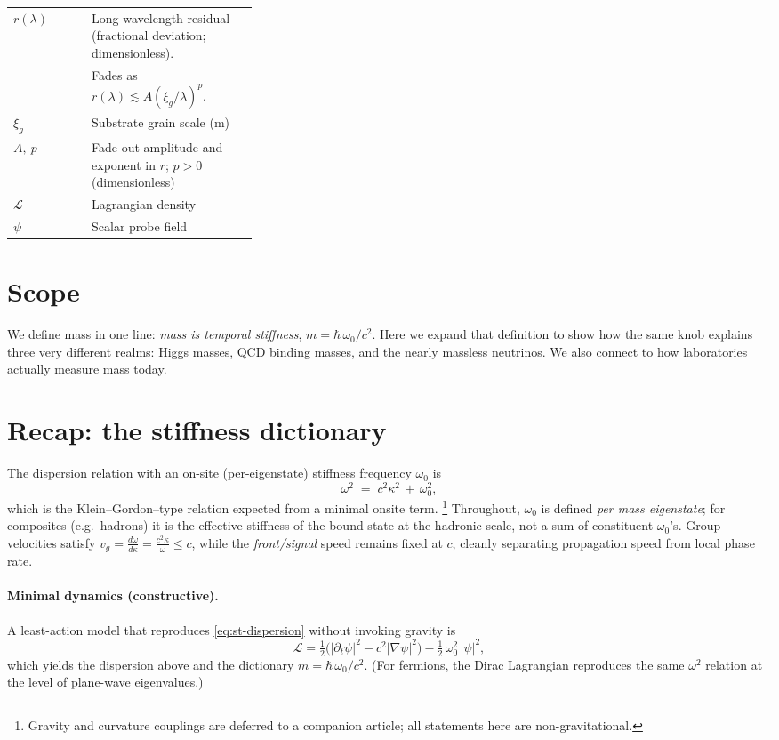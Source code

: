 \documentclass[11pt,oneside]{article}
\begin{document}
\begin{table}[htbp]
\begin{tabularx}{\linewidth}{@{}>{\raggedright\arraybackslash}p{0.32\linewidth} >{\raggedright\arraybackslash}X@{}}
\hline
$r(\lambda)$ & Long-wavelength residual (fractional deviation; dimensionless).\\
& Fades as $r(\lambda)\lesssim A(\xi_g/\lambda)^p$. \\
$\xi_g$ & Substrate grain scale (m) \\
$A,\ p$ & Fade-out amplitude and exponent in $r$; $p>0$ (dimensionless) \\
\hline
$\mathcal{L}$ & Lagrangian density \\
$\psi$ & Scalar probe field \\
\hline
\end{tabularx}
\end{table}

\clearpage
\section*{Scope}
We define mass in one line: \emph{mass is temporal stiffness}, \(m=\hbar\,\omega_0/c^2\).
Here we expand that definition to show how the same knob explains three very different
realms: Higgs masses, QCD binding masses, and the nearly massless neutrinos.
We also connect to how laboratories actually measure mass today.

\section{Recap: the stiffness dictionary}
The dispersion relation with an on-site (per-eigenstate) stiffness frequency \(\omega_0\) is
\begin{equation}
\omega^2 \;=\; c^2\kappa^2 \,+\, \omega_0^2,
\label{eq:st-dispersion}
\end{equation}
which is the Klein--Gordon--type relation expected from a minimal onsite term.%
\footnote{Gravity and curvature couplings are deferred to a companion article; all statements here are non-gravitational.}
Throughout, \(\omega_0\) is defined \emph{per mass eigenstate}; for composites (e.g.\ hadrons) it is the effective stiffness of the bound state at the hadronic scale, not a sum of constituent \(\omega_0\)'s.
Group velocities satisfy \(v_g=\tfrac{d\omega}{d\kappa}=\tfrac{c^2\kappa}{\omega}\le c\), while the \emph{front/signal} speed remains fixed at \(c\), cleanly separating propagation speed from local phase rate.

\paragraph{Minimal dynamics (constructive).}
A least-action model that reproduces \eqref{eq:st-dispersion} without invoking gravity is
\[
\mathcal{L}
=\tfrac{1}{2}\Big(|\partial_t\psi|^2-c^2|\nabla\psi|^2\Big)-\tfrac{1}{2}\,\omega_0^2\,|\psi|^2,
\]
which yields the dispersion above and the dictionary \(m=\hbar\,\omega_0/c^2\).
(For fermions, the Dirac Lagrangian reproduces the same \(\omega^2\) relation at the level of plane-wave eigenvalues.)
\end{document}
